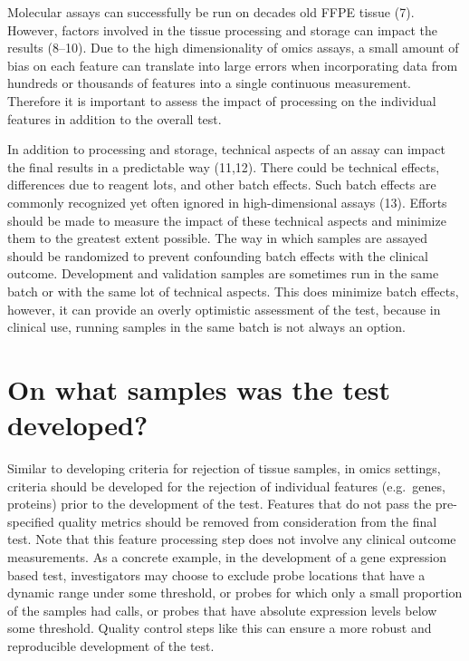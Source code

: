 \documentclass[11pt]{article}
\begin{document}
Molecular assays can successfully be run on decades old FFPE tissue (7).
However, factors involved in the tissue processing and storage can
impact the results (8--10). Due to the high dimensionality of omics
assays, a small amount of bias on each feature can translate into large
errors when incorporating data from hundreds or thousands of features
into a single continuous measurement. Therefore it is important to
assess the impact of processing on the individual features in addition
to the overall test.

In addition to processing and storage, technical aspects of an assay can
impact the final results in a predictable way (11,12). There could be
technical effects, differences due to reagent lots, and other batch
effects. Such batch effects are commonly recognized yet often ignored in
high-dimensional assays (13). Efforts should be made to measure the
impact of these technical aspects and minimize them to the greatest
extent possible. The way in which samples are assayed should be
randomized to prevent confounding batch effects with the clinical
outcome. Development and validation samples are sometimes run in the
same batch or with the same lot of technical aspects. This does minimize
batch effects, however, it can provide an overly optimistic assessment
of the test, because in clinical use, running samples in the same batch
is not always an option.

\section{On what samples was the test
developed?}\label{on-what-samples-was-the-test-developed}

Similar to developing criteria for rejection of tissue samples, in omics
settings, criteria should be developed for the rejection of individual
features (e.g.~genes, proteins) prior to the development of the test.
Features that do not pass the pre-specified quality metrics should be
removed from consideration from the final test. Note that this feature
processing step does not involve any clinical outcome measurements. As a
concrete example, in the development of a gene expression based test,
investigators may choose to exclude probe locations that have a dynamic
range under some threshold, or probes for which only a small proportion
of the samples had calls, or probes that have absolute expression levels
below some threshold. Quality control steps like this can ensure a more
robust and reproducible development of the test.
\end{document}
